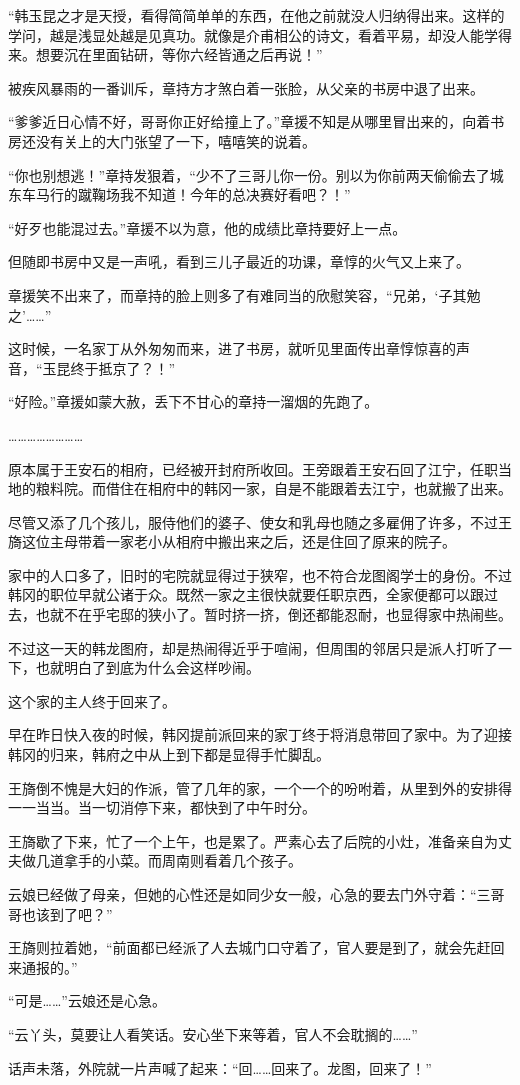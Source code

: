 “韩玉昆之才是天授，看得简简单单的东西，在他之前就没人归纳得出来。这样的学问，越是浅显处越是见真功。就像是介甫相公的诗文，看着平易，却没人能学得来。想要沉在里面钻研，等你六经皆通之后再说！”

被疾风暴雨的一番训斥，章持方才煞白着一张脸，从父亲的书房中退了出来。

“爹爹近日心情不好，哥哥你正好给撞上了。”章援不知是从哪里冒出来的，向着书房还没有关上的大门张望了一下，嘻嘻笑的说着。

“你也别想逃！”章持发狠着，“少不了三哥儿你一份。别以为你前两天偷偷去了城东车马行的蹴鞠场我不知道！今年的总决赛好看吧？！”

“好歹也能混过去。”章援不以为意，他的成绩比章持要好上一点。

但随即书房中又是一声吼，看到三儿子最近的功课，章惇的火气又上来了。

章援笑不出来了，而章持的脸上则多了有难同当的欣慰笑容，“兄弟，‘子其勉之’……”

这时候，一名家丁从外匆匆而来，进了书房，就听见里面传出章惇惊喜的声音，“玉昆终于抵京了？！”

“好险。”章援如蒙大赦，丢下不甘心的章持一溜烟的先跑了。

……………………

原本属于王安石的相府，已经被开封府所收回。王旁跟着王安石回了江宁，任职当地的粮料院。而借住在相府中的韩冈一家，自是不能跟着去江宁，也就搬了出来。

尽管又添了几个孩儿，服侍他们的婆子、使女和乳母也随之多雇佣了许多，不过王旖这位主母带着一家老小从相府中搬出来之后，还是住回了原来的院子。

家中的人口多了，旧时的宅院就显得过于狭窄，也不符合龙图阁学士的身份。不过韩冈的职位早就公诸于众。既然一家之主很快就要任职京西，全家便都可以跟过去，也就不在乎宅邸的狭小了。暂时挤一挤，倒还都能忍耐，也显得家中热闹些。

不过这一天的韩龙图府，却是热闹得近乎于喧闹，但周围的邻居只是派人打听了一下，也就明白了到底为什么会这样吵闹。

这个家的主人终于回来了。

早在昨日快入夜的时候，韩冈提前派回来的家丁终于将消息带回了家中。为了迎接韩冈的归来，韩府之中从上到下都是显得手忙脚乱。

王旖倒不愧是大妇的作派，管了几年的家，一个一个的吩咐着，从里到外的安排得一一当当。当一切消停下来，都快到了中午时分。

王旖歇了下来，忙了一个上午，也是累了。严素心去了后院的小灶，准备亲自为丈夫做几道拿手的小菜。而周南则看着几个孩子。

云娘已经做了母亲，但她的心性还是如同少女一般，心急的要去门外守着：“三哥哥也该到了吧？”

王旖则拉着她，“前面都已经派了人去城门口守着了，官人要是到了，就会先赶回来通报的。”

“可是……”云娘还是心急。

“云丫头，莫要让人看笑话。安心坐下来等着，官人不会耽搁的……”

话声未落，外院就一片声喊了起来：“回……回来了。龙图，回来了！”

